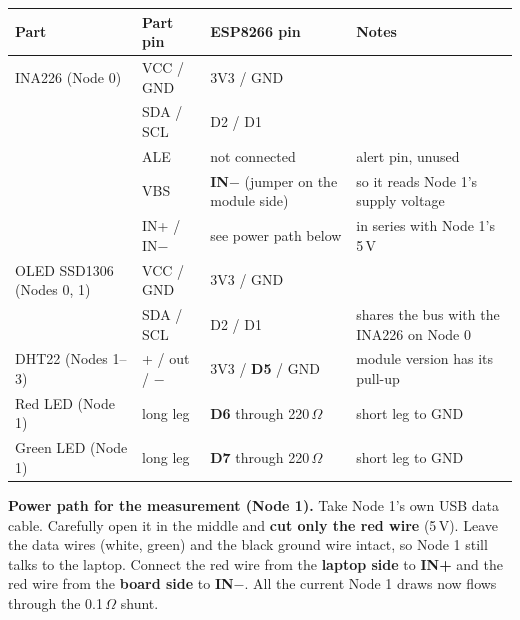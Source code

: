\documentclass[10pt,a4paper]{article}
\begin{document}
\begin{center}
\small
\begin{tabular}{@{}llll@{}}
\toprule
Part & Part pin & ESP8266 pin & Notes\\
\midrule
INA226 (Node 0) & VCC / GND & 3V3 / GND & \\
 & SDA / SCL & D2 / D1 & \\
 & ALE & not connected & alert pin, unused\\
 & VBS & \textbf{IN$-$} (jumper on the module side) & so it reads Node 1's supply voltage\\
 & IN+ / IN$-$ & see power path below & in series with Node 1's 5\,V\\
OLED SSD1306 (Nodes 0, 1) & VCC / GND & 3V3 / GND & \\
 & SDA / SCL & D2 / D1 & shares the bus with the INA226 on Node 0\\
DHT22 (Nodes 1--3) & + / out / $-$ & 3V3 / \textbf{D5} / GND & module version has its pull-up\\
Red LED (Node 1) & long leg & \textbf{D6} through 220\,$\Omega$ & short leg to GND\\
Green LED (Node 1) & long leg & \textbf{D7} through 220\,$\Omega$ & short leg to GND\\
\bottomrule
\end{tabular}
\end{center}

\textbf{Power path for the measurement (Node 1).} Take Node 1's own USB data cable. Carefully open it
in the middle and \textbf{cut only the red wire} (5\,V). Leave the data wires (white, green) and the black
ground wire intact, so Node 1 still talks to the laptop. Connect the red wire from the \textbf{laptop side}
to \textbf{IN+} and the red wire from the \textbf{board side} to \textbf{IN$-$}. All the current Node 1
draws now flows through the 0.1\,$\Omega$ shunt.
\end{document}
